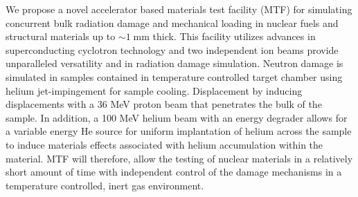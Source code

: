 \documentclass[final,3p,times,twocolumn]{elsarticle} %
\begin{document}

We propose a novel accelerator based materials test facility (MTF) for simulating concurrent bulk radiation damage and mechanical loading in nuclear 
fuels and structural materials up to $\sim 1\;\mathrm{mm}$ thick.  This facility utilizes advances in superconducting cyclotron technology and two 
independent ion beams provide unparalleled versatility and in radiation damage simulation.  Neutron damage is simulated in samples contained in 
temperature controlled target chamber using helium jet-impingement for sample cooling.  Displacement by inducing displacements with a 36 MeV proton 
beam that penetrates the bulk of the sample.  In addition, a 100 MeV helium beam with an energy degrader allows for a variable energy He source for 
uniform implantation of helium across the sample to induce materials effects associated with helium accumulation within the material.  MTF will 
therefore, allow the testing of nuclear materials in a relatively short amount of time with independent control of the damage mechanisms in a 
temperature controlled, inert gas environment.

 





\end{document}
